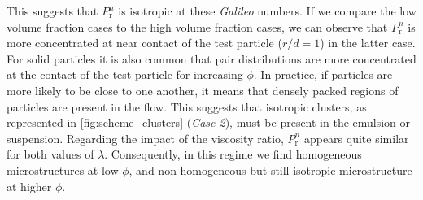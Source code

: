 This suggests that $P_\text{r}^n$ is isotropic at these \textit{Galileo} numbers. 
If we compare the low volume fraction cases to the high volume fraction cases, we can observe that $P_\text{r}^n$ is more concentrated at near contact of the test particle ($r/d = 1$) in the latter case.
For solid particles it is also common that pair distributions are more concentrated at the contact of the test particle for increasing $\phi$. 
In practice, if particles are more likely to be close to one another, it means that densely packed regions of particles are present in the flow.
This suggests that isotropic clusters, as represented in \ref{fig:scheme_clusters} (\textit{Case 2}), must be present in the emulsion or suspension. 
Regarding the impact of the viscosity ratio, $P_\text{r}^n$ appears quite similar for both values of $\lambda$. 
Consequently, in this regime we find homogeneous microstructures at low $\phi$, and non-homogeneous but still isotropic microstructure at higher $\phi$. 

